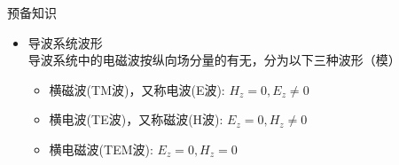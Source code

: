 \begin{frame}{预备知识}
    \begin{itemize}
        \item 导波系统波形\\
              导波系统中的电磁波按纵向场分量的有无，分为以下三种波形（模）
              \begin{itemize}
                  \item 横磁波(TM波)，又称电波(E波): $H_z=0,E_z\neq 0$
                  \item 横电波(TE波)，又称磁波(H波): $E_z=0,H_z\neq 0$
                  \item 横电磁波(TEM波): $E_z=0,H_z=0$
              \end{itemize}
    \end{itemize}
\end{frame}


